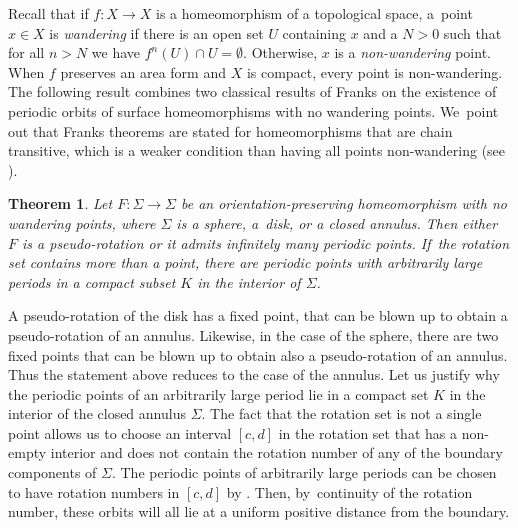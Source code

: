 \documentclass[10pt]{amsart}
\newtheorem{theorem}{Theorem}[section]
\theoremstyle{definition}
\begin{document}
Recall that if $f:X\to X$ is a homeomorphism of a topological space, a~point $x\in X$ is \emph{wandering} if there is an open set $U$ containing $x$ and a $N>0$ such that for all $n>N$ we have $f^n(U)\cap U=\emptyset$. Otherwise, $x$ is a \emph{non-wandering} point. When $f$ preserves an area form and $X$ is compact, every point is non-wandering. The following result combines two classical results of Franks \cite{F1, F2} on the existence of periodic orbits of surface homeomorphisms with no wandering points. We~point out that Franks theorems are stated for homeomorphisms that are chain transitive, which is a weaker condition than having all points non-wandering (see \cite[Prop.\,1.2]{F1}).

\begin{theorem}\label{thm:Fk}
Let $F:\Sigma \rightarrow \Sigma$ be an orientation-preserving homeomorphism with no wandering points, where $\Sigma$ is a sphere, a~disk, or a closed annulus. Then either~$F$ is a pseudo-rotation or it admits infinitely many periodic points. If~the rotation set contains more than a point, there are periodic points with arbitrarily large periods in a compact subset $K$ in the interior of $\Sigma$.
\end{theorem}

{A pseudo-rotation of the disk has a fixed point, that can be blown up to obtain a pseudo-rotation of an annulus. Likewise, in the case of the sphere, there are two fixed points that can be blown up to obtain also a pseudo-rotation of an annulus. Thus the statement above reduces to the case of the annulus.}{ Let us justify why the periodic points of an arbitrarily large period lie in a compact set $K$ in the interior of the closed annulus $\Sigma$. The fact that the rotation set is not a single point allows us to choose an interval $[c,d]$ in the rotation set that has a non-empty interior and does not contain the rotation number of any of the boundary components of $\Sigma$. The periodic points of arbitrarily large periods can be chosen to have rotation numbers in $[c,d]$ by \cite[Cor.\,2.4]{F1}. Then, by~continuity of the rotation number, these orbits will all lie at a uniform positive distance from the boundary.}
\end{document}
